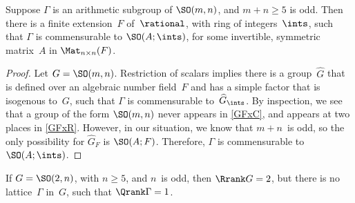 \begin{cor} \label{SO1nCpctList}
  Suppose\/ $\Gamma$ is an arithmetic subgroup of\/ $\SO(m,n)$, and $m+n \ge 5$ is odd. Then there is a finite extension~$F$ of\/~$\rational$, with ring of integers~$\ints$, such that\/ $\Gamma$ is commensurable to\/ $\SO(A; \ints)$, for some invertible, symmetric matrix~$A$ in\/ $\Mat_{n \times n}(F)$.
 \end{cor}
 
 \begin{proof}
 Let $G = \SO(m,n)$.
 Restriction of scalars  implies there is a group~$\widehat G$ that is defined over an algebraic number field~$F$ and has a simple factor that is isogenous to~$G$, such that $\Gamma$ is commensurable to~$\widehat G_\ints$.  
 By inspection, we see that a group of the form $\SO(m,n)$ never appears in \cref{GFxC}, and appears at two places in \cref{GFxR}. However, in our situation, we know that $m + n$~is odd, so the only possibility for $\widehat G_F$ is $\SO(A; F)$. Therefore, $\Gamma$ is commensurable to\/ $\SO(A; \ints)$. 
 \end{proof}


\begin{cor} \label{QrankGap}
 If $G = \SO(2,n)$, with $n \ge 5$, and
$n$~is odd, then\/ $\Rrank G = 2$, but there is no
lattice\/~$\Gamma$ in~$G$, such that\/ $\Qrank \Gamma = 1$.
 \end{cor}

